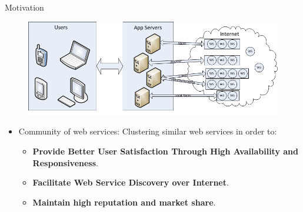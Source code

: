 \documentclass{beamer}
\begin{document}
\begin{frame}{Motivation}
    \begin{figure}[htbp]
        \centering
        \includegraphics[width=1.0 \columnwidth]{figures/wsinternet.png}
    \end{figure}

    \begin{itemize}
        \item Community of web services: Clustering similar web services in order to:
        \begin{itemize}
            \item \textbf{Provide Better User Satisfaction Through High Availability and Responsiveness}.
            \item \textbf{Facilitate Web Service Discovery over Internet}.
            \item \textbf{Maintain high reputation and market share}.
        \end{itemize}
    \end{itemize}
\end{frame}
\end{document}
